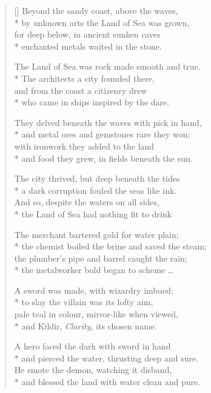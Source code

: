 \settowidth{\versewidth}{Beyond the Western coast, above the waves,}
\begin{verse}[\versewidth]
Beyond the sandy coast, above the waves,\\*
by unknown arts the Land of Sea was grown,\\
for deep below, in ancient sunken caves\\*
enchanted metals waited in the stone.

The Land of Sea was rock made smooth and true.\\*
The architects a city founded there,\\
and from the coast a citizenry drew\\*
who came in ships inspired by the dare.

They delved beneath the waves with pick in hand,\\*
and metal ores and gemstones rare they won;\\
with ironwork they added to the land\\*
and food they grew, in fields beneath the sun.

The city thrived, but deep beneath the tides\\*
a dark corruption fouled the seas like ink.\\
And so, despite the waters on all sides,\\*
the Land of Sea had nothing fit to drink

The merchant bartered gold for water plain;\\*
the chemist boiled the brine and saved the steam;\\
the plumber's pipe and barrel caught the rain;\\*
the metalworker bold began to scheme \ldots

A sword was made, with wizardry imbued;\\*
to slay the villain was its lofty aim,\\
pale teal in colour, mirror-like when viewed,\\*
and K\=\i{}ldir, \emph{Clarity}, its chosen name.

A hero faced the dark with sword in hand\\*
and pierced the water, thrusting deep and sure.\\
He smote the demon, watching it disband,\\*
and blessed the land with water clean and pure.
\end{verse}

